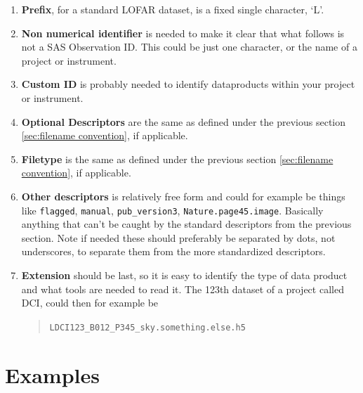 \documentclass[a4paper,10pt,bibtotoc]{scrartcl}
\begin{document}
\begin{enumerate}
\item \textbf{Prefix}, for a standard LOFAR dataset, is a fixed single
  character, `L'.
\item \textbf{Non numerical identifier} is needed to make it clear
  that what follows is not a SAS Observation ID. This could be just
  one character, or the name of a project or instrument.
\item \textbf{Custom ID} is probably needed to identify dataproducts
  within your project or instrument.
\item \textbf{Optional Descriptors} are the same as defined under the
  previous section \ref{sec:filename convention}, if applicable.
\item \textbf{Filetype} is the same as defined under the previous
  section \ref{sec:filename convention}, if applicable.
\item \textbf{Other descriptors} is relatively free form and could for
  example be things like \verb|flagged|, \verb|manual|,
  \verb|pub_version3|, \verb|Nature.page45.image|. Basically anything
  that can't be caught by the standard descriptors from the previous
  section. Note if needed these should preferably be separated by
  dots, not underscores, to separate them from the more standardized
  descriptors.
\item \textbf{Extension} should be last, so it is easy to identify the
  type of data product and what tools are needed to read it. The 123th
  dataset of a project called DCI, could then for example be
  \begin{verse}
    \verb|LDCI123_B012_P345_sky.something.else.h5|
  \end{verse}
\end{enumerate}


\section{Examples}
\label{sec:examples}
\end{document}
